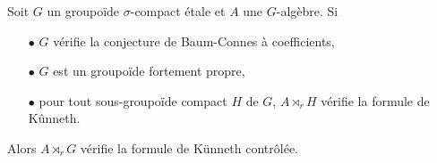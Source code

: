 \begin{thm}
Soit $G$ un groupoïde $\sigma$-compact étale et $A$ une $G$-algèbre. Si 
\begin{itemize}
\item[$\bullet$] $G$ vérifie la conjecture de Baum-Connes à coefficients,
\item[$\bullet$] $G$ est un groupoïde fortement propre,
\item[$\bullet$] pour tout sous-groupoïde compact $H$ de $G$, $A\rtimes_r H$ vérifie la formule de Kûnneth.
\end{itemize} 
Alors $A\rtimes_r G$ vérifie la formule de Künneth contrôlée.
\end{thm}



































